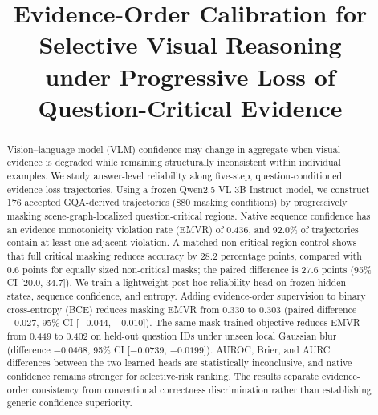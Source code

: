 \documentclass[10pt,twocolumn]{article}
\title{Evidence-Order Calibration for Selective Visual Reasoning\\
under Progressive Loss of Question-Critical Evidence}
\author{}
\date{}
\begin{document}
\maketitle

\begin{abstract}
Vision--language model (VLM) confidence may change in aggregate when visual evidence is degraded while remaining structurally inconsistent within individual examples. We study answer-level reliability along five-step, question-conditioned evidence-loss trajectories. Using a frozen Qwen2.5-VL-3B-Instruct model, we construct 176 accepted GQA-derived trajectories (880 masking conditions) by progressively masking scene-graph-localized question-critical regions. Native sequence confidence has an evidence monotonicity violation rate (EMVR) of 0.436, and 92.0\% of trajectories contain at least one adjacent violation. A matched non-critical-region control shows that full critical masking reduces accuracy by 28.2 percentage points, compared with 0.6 points for equally sized non-critical masks; the paired difference is 27.6 points (95\% CI [20.0, 34.7]). We train a lightweight post-hoc reliability head on frozen hidden states, sequence confidence, and entropy. Adding evidence-order supervision to binary cross-entropy (BCE) reduces masking EMVR from 0.330 to 0.303 (paired difference $-0.027$, 95\% CI [$-0.044$, $-0.010$]). The same mask-trained objective reduces EMVR from 0.449 to 0.402 on held-out question IDs under unseen local Gaussian blur (difference $-0.0468$, 95\% CI [$-0.0739$, $-0.0199$]). AUROC, Brier, and AURC differences between the two learned heads are statistically inconclusive, and native confidence remains stronger for selective-risk ranking. The results separate evidence-order consistency from conventional correctness discrimination rather than establishing generic confidence superiority.
\end{abstract}













\appendix


\clearpage
\end{document}

